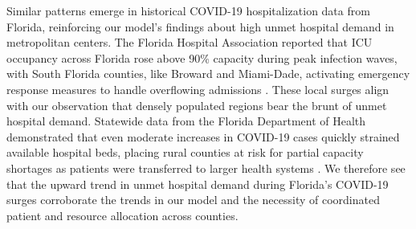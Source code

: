 \documentclass{article}
\begin{document}
{\color{blue}
Similar patterns emerge in historical COVID-19 hospitalization data from Florida, reinforcing our model's findings about high unmet hospital demand in metropolitan centers. The Florida Hospital Association reported that ICU occupancy across Florida rose above 90\% capacity during peak infection waves, with South Florida counties, like Broward and Miami-Dade, activating emergency response measures to handle overflowing admissions \parencite{ FloridaHospitalAssociation2021}. These local surges align with our observation that densely populated regions bear the brunt of unmet hospital demand. Statewide data from the Florida Department of Health demonstrated that even moderate increases in COVID-19 cases quickly strained available hospital beds, placing rural counties at risk for partial capacity shortages as patients were transferred to larger health systems \parencite{FloridaDepartmentHealth2021}. We therefore see that the upward trend in unmet hospital demand during Florida's COVID-19 surges corroborate the trends in our model and the necessity of coordinated patient and resource allocation across counties. 
}
\end{document}
